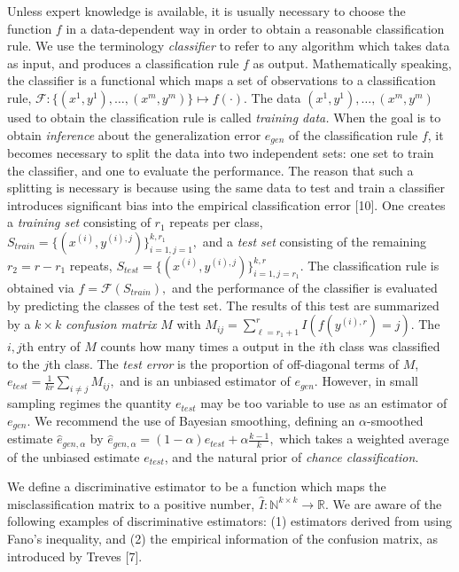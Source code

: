 \documentclass{article}
\begin{document}
Unless expert knowledge is available, it is usually necessary to
choose the function $f$ in a data-dependent way in order to obtain a
reasonable classification rule.  We use the terminology
\emph{classifier} to refer to any algorithm which takes data as input,
and produces a classification rule $f$ as output.  Mathematically
speaking, the classifier is a functional which maps a set of
observations to a classification rule, $ \mathcal{F}:
\{(x^{1},y^{1}),\hdots, (x^{m}, y^{m})\} \mapsto f(\cdot).  $ The data
$(x^1,y^1),\hdots, (x^m, y^m)$ used to obtain the classification rule
is called \emph{training data.}  When the goal is to obtain
\emph{inference} about the generalization error $e_{gen}$ of the
classification rule $f$, it becomes necessary to split the data into
two independent sets: one set to train the classifier, and one to
evaluate the performance.  The reason that such a splitting is
necessary is because using the same data to test and train a
classifier introduces significant bias into the empirical
classification error [10].  One creates a
\emph{training set} consisting of $r_1$ repeats per class, $ S_{train}
= \{(x^{(i)}, y^{(i),j})\}_{i=1, j=1}^{k, r_1}, $ and a \emph{test
  set} consisting of the remaining $r_2 = r - r_1$ repeats, $ S_{test}
= \{(x^{(i)}, y^{(i),j})\}_{i=1, j=r_1}^{k, r}.  $ The classification
rule is obtained via $ f = \mathcal{F}(S_{train}), $ and the
performance of the classifier is evaluated by predicting the classes
of the test set.  The results of this test are summarized by a $k
\times k$ \emph{confusion matrix} $M$ with $ M_{ij} = \sum_{\ell=r_1 +
  1}^r I(f(y^{(i), r}) = j).  $ The $i, j$th entry of $M$ counts how
many times a output in the $i$th class was classified to the $j$th
class.  The \emph{test error} is the proportion of off-diagonal terms
of $M$, $ e_{test} = \frac{1}{kr} \sum_{i \neq j} M_{ij}, $ and is an
unbiased estimator of $e_{gen}$.  However, in small sampling regimes
the quantity $e_{test}$ may be too variable to use as an estimator of
$e_{gen}$.  We recommend the use of Bayesian smoothing, defining an
$\alpha$-smoothed estimate $\hat{e}_{gen, \alpha}$ by $ \hat{e}_{gen,
  \alpha} = (1 - \alpha) e_{test} + \alpha \frac{k-1}{k}, $ which
takes a weighted average of the unbiased estimate $e_{test}$, and the
natural prior of \emph{chance classification}.

We define a discriminative estimator to be a function which maps the
misclassification matrix to a positive number, $ \hat{I}:
\mathbb{N}^{k \times k} \to \mathbb{R}.  $ We are aware of the
following examples of discriminative estimators: (1) estimators
derived from using Fano's inequality, and (2) the empirical
information of the confusion matrix, as introduced by Treves [7].
\end{document}
